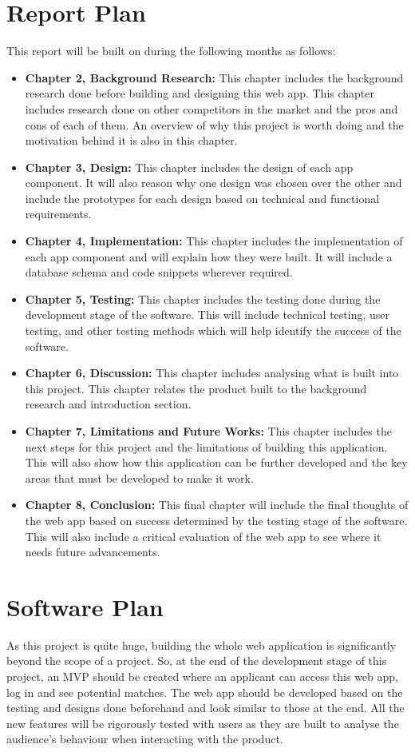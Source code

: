 \section{Report Plan}
This report will be built on during the following months as follows:
\begin{itemize}
    \item \textbf{Chapter 2, Background Research:} This chapter includes the background research done before building and designing this web app. This chapter includes research done on other competitors in the market and the pros and cons of each of them. An overview of why this project is worth doing and the motivation behind it is also in this chapter.
    \item \textbf{Chapter 3, Design:} This chapter includes the design of each app component. It will also reason why one design was chosen over the other and include the prototypes for each design based on technical and functional requirements.
    \item \textbf{Chapter 4, Implementation:} This chapter includes the implementation of each app component and will explain how they were built. It will include a database schema and code snippets wherever required.
    \item \textbf{Chapter 5, Testing:} This chapter includes the testing done during the development stage of the software. This will include technical testing, user testing, and other testing methods which will help identify the success of the software.
    \item \textbf{Chapter 6, Discussion:} This chapter includes analysing what is built into this project. This chapter relates the product built to the background research and introduction section.
    \item \textbf{Chapter 7, Limitations and Future Works:} This chapter includes the next steps for this project and the limitations of building this application. This will also show how this application can be further developed and the key areas that must be developed to make it work.
    \item \textbf{Chapter 8, Conclusion:} This final chapter will include the final thoughts of the web app based on success determined by the testing stage of the software. This will also include a critical evaluation of the web app to see where it needs future advancements.
\end{itemize}

\section{Software Plan}
As this project is quite huge, building the whole web application is significantly beyond the scope of a project. So, at the end of the development stage of this project, an MVP should be created where an applicant can access this web app, log in and see potential matches. The web app should be developed based on the testing and designs done beforehand and look similar to those at the end. All the new features will be rigorously tested with users as they are built to analyse the audience's behaviour when interacting with the product.